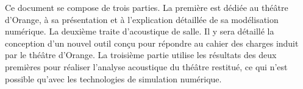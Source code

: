 Ce document se compose de trois parties. La première est dédiée au théâtre d'Or\-ange, à sa présentation et à l'explication détaillée de sa modélisation numérique. La deux\-ième traite d'acoustique de salle. Il y sera détaillé la conception d'un nouvel outil conçu pour répondre au cahier des charges induit par le théâtre d'Orange. La troisième partie utilise les résultats des deux premières pour réaliser l'analyse acoustique du théâtre restitué, ce qui n'est possible qu'avec les technologies de simulation numérique. 
